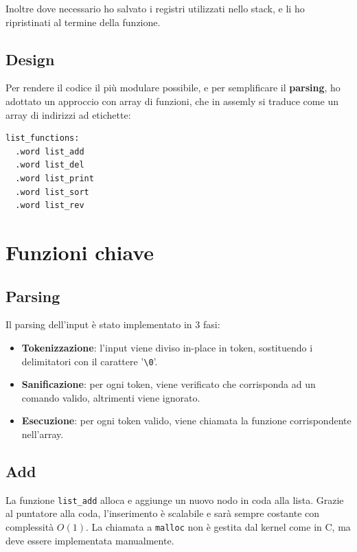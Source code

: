 \documentclass[a4paper,12pt]{article}
\begin{document}
Inoltre dove necessario ho salvato i registri utilizzati nello stack, e li ho ripristinati al termine della funzione.

\subsection{Design}

Per rendere il codice il più modulare possibile, e per semplificare il \textbf{parsing}, ho adottato un approccio con array di funzioni, che in assemly si traduce come un array di indirizzi ad etichette:

\begin{lstlisting}[language=riscv]
list_functions:
  .word list_add
  .word list_del
  .word list_print
  .word list_sort
  .word list_rev
\end{lstlisting}

\section{Funzioni chiave}

\subsection{Parsing}

Il parsing dell'input è stato implementato in 3 fasi:
\begin{itemize}
    \item \textbf{Tokenizzazione}: l'input viene diviso in-place in token, sostituendo i delimitatori con il carattere '\texttt{\textbackslash0}'.
    \item \textbf{Sanificazione}: per ogni token, viene verificato che corrisponda ad un comando valido, altrimenti viene ignorato.
    \item \textbf{Esecuzione}: per ogni token valido, viene chiamata la funzione corrispondente nell'array.
\end{itemize}

\subsection{Add}

La funzione \texttt{list\_add} alloca e aggiunge un nuovo nodo in coda alla lista.
Grazie al puntatore alla coda, l'inserimento è scalabile e sarà sempre costante con complessità $O(1)$.
La chiamata a \texttt{malloc} non è gestita dal kernel come in C, ma deve essere implementata manualmente.
\end{document}
